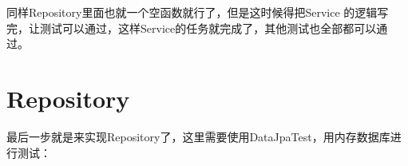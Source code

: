 \documentclass[12pt]{article}
\begin{document}
\begin{Shaded}
\begin{Highlighting}[]
    \OperatorTok{(}\OperatorTok{,}\OperatorTok{());}
    \OperatorTok{(}\OperatorTok{,}\OperatorTok{(}\OperatorTok{());}
    \OperatorTok{(}\OperatorTok{,}\OperatorTok{(}\OperatorTok{());}
    \OperatorTok{(}\OperatorTok{,}\OperatorTok{(}\OperatorTok{());}
    \OperatorTok{(}\OperatorTok{,}\OperatorTok{(}\OperatorTok{());}
  \OperatorTok{\}}
\OperatorTok{\}}
\end{Highlighting}
\end{Shaded}

同样Repository里面也就一个空函数就行了，但是这时候得把Service 的逻辑写完，让测试可以通过，这样Service的任务就完成了，其他测试也全部都可以通过。

\section{Repository}\label{repository}

最后一步就是来实现Repository了，这里需要使用DataJpaTest，用内存数据库进行测试：
\end{document}
